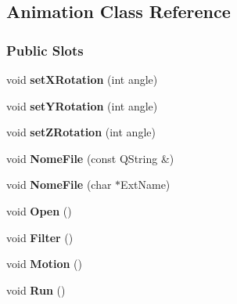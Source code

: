 \hypertarget{classAnimation}{\subsection{\-Animation \-Class \-Reference}
\label{classAnimation}
}
\subsubsection*{\-Public \-Slots}
\begin{DoxyCompactItemize}
\item 
\hypertarget{classAnimation_a59cabf1708863e82bdfced18dc630e37}{void {\bfseries set\-X\-Rotation} (int angle)}\label{classAnimation_a59cabf1708863e82bdfced18dc630e37}

\item 
\hypertarget{classAnimation_a38ddca1c05cad19158b0a88b172e857a}{void {\bfseries set\-Y\-Rotation} (int angle)}\label{classAnimation_a38ddca1c05cad19158b0a88b172e857a}

\item 
\hypertarget{classAnimation_a6cb4ef9b53294acc68dd22f74cebfbe9}{void {\bfseries set\-Z\-Rotation} (int angle)}\label{classAnimation_a6cb4ef9b53294acc68dd22f74cebfbe9}

\item 
\hypertarget{classAnimation_aed7f5207ef3aa32ebbdb28c9a1c1d82d}{void {\bfseries \-Nome\-File} (const \-Q\-String \&)}\label{classAnimation_aed7f5207ef3aa32ebbdb28c9a1c1d82d}

\item 
\hypertarget{classAnimation_aa7e7b6d7ce17b45aadd239d2bece1f6d}{void {\bfseries \-Nome\-File} (char $\ast$\-Ext\-Name)}\label{classAnimation_aa7e7b6d7ce17b45aadd239d2bece1f6d}

\item 
\hypertarget{classAnimation_a5e53001785ff30ae485a113b9b8a0ddc}{void {\bfseries \-Open} ()}\label{classAnimation_a5e53001785ff30ae485a113b9b8a0ddc}

\item 
\hypertarget{classAnimation_aee20dab02a80806a138b0f4741666efc}{void {\bfseries \-Filter} ()}\label{classAnimation_aee20dab02a80806a138b0f4741666efc}

\item 
\hypertarget{classAnimation_a3cb309e22382e343f4bf452cef422d80}{void {\bfseries \-Motion} ()}\label{classAnimation_a3cb309e22382e343f4bf452cef422d80}

\item 
\hypertarget{classAnimation_aa3eca255b6be227d7d901cc2a72017a5}{void {\bfseries \-Run} ()}\label{classAnimation_aa3eca255b6be227d7d901cc2a72017a5}


\end{DoxyCompactItemize}
